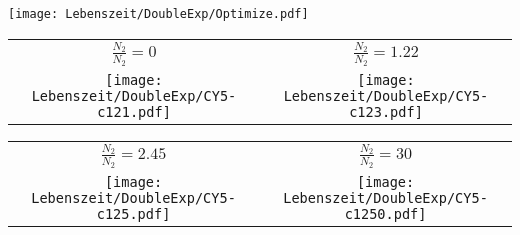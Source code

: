 \begin{center}
    \texttt{[image: Lebenszeit/DoubleExp/Optimize.pdf]}
    \label{image:doubleOpt}
\end{center}
\begin{center}
    \begin{tabular}{c c}
        $\frac{N_2}{N_2}=0$ & $\frac{N_2}{N_2}=1.22$\\
        \texttt{[image: Lebenszeit/DoubleExp/CY5-c121.pdf]}
        &
        \texttt{[image: Lebenszeit/DoubleExp/CY5-c123.pdf]}
    \end{tabular}
    \begin{tabular}{c c}
        $\frac{N_2}{N_2}=2.45$ & $\frac{N_2}{N_2}=30$\\
        \texttt{[image: Lebenszeit/DoubleExp/CY5-c125.pdf]}
        &
        \texttt{[image: Lebenszeit/DoubleExp/CY5-c1250.pdf]}
    \end{tabular}
    \label{image:doubleOptprozess}
\end{center}


